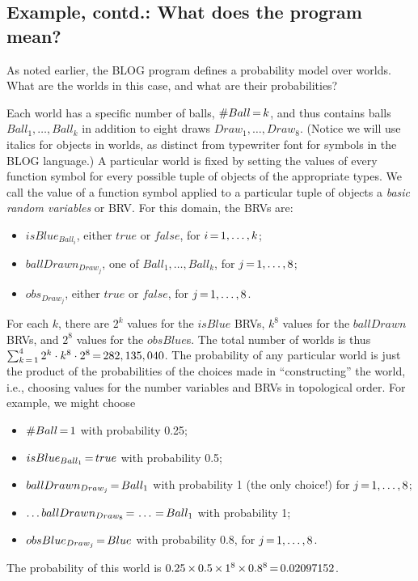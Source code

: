 \documentclass[12pt]{article}
\begin{document}
\subsection{Example, contd.: What does the program mean?}

As noted earlier, the BLOG program defines a probability model over worlds. 
What are the worlds in this case, and what are their probabilities?

Each world has a specific number of balls, $\#Ball{\,{=}\,} k$, and thus contains
balls $Ball_1,\ldots,Ball_k$ in addition to eight draws $Draw_1,\ldots,Draw_8$.
(Notice we will use italics for objects in worlds, as distinct from
typewriter font for symbols in the BLOG language.)
A particular world is fixed by setting the values of every function symbol
for every possible tuple of objects of the appropriate types. We call
the value of a function symbol applied to a particular tuple of objects
a {\em basic random variables} or BRV. For this domain, the BRVs are:
\begin{itemize}
\item $isBlue_{Ball_i}$, either $true$ or $false$, for $i{\,{=}\,}1,\ldots,k$;
\item $ballDrawn_{Draw_j}$, one of $Ball_1,\ldots,Ball_k$,  for $j{\,{=}\,}1,\ldots,8$;
\item $obs_{Draw_j}$, either $true$ or $false$,  for $j{\,{=}\,}1,\ldots,8$.
\end{itemize}
For each $k$, there are $2^k$ values for the $isBlue$ BRVs,
$k^8$ values for the $ballDrawn$ BRVs, and $2^8$ values for
the $obsBlue$s. The total number of worlds is thus
$\sum_{k{\,{=}\,} 1}^4 2^k \cdot k^8 \cdot 2^8 {\,{=}\,} 282,135,040$.
The probability of any particular world is just the product of the probabilities 
of the choices made in ``constructing'' the world, i.e., choosing values
for the number variables and BRVs in topological order. For example, we might choose
\begin{itemize}
\item $\#Ball{\,{=}\,} 1$ with probability 0.25;
\item $isBlue_{Ball_1}{\,{=}\,} true$ with probability 0.5;
\item $ballDrawn_{Draw_j}{\,{=}\,} Ball_1$ with probability 1 (the only choice!) for $j{\,{=}\,}1,\ldots,8$;
\item $\ldots ballDrawn_{Draw_8}{\,{=}\,} \ldots {\,{=}\,} Ball_1$ with probability 1;
\item $obsBlue_{Draw_j}{\,{=}\,} Blue$ with probability 0.8, for $j{\,{=}\,}1,\ldots,8$.
\end{itemize}
The probability of this world is $0.25 {\,\times\,} 0.5 {\,\times\,} 1^8 {\,\times\,} 0.8^8{\,{=}\,} 0.02097152$.
\end{document}
